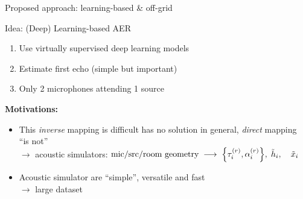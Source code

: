 \begin{frame}{Proposed approach: learning-based \& off-grid \hfill\faProjectDiagram}

    \begin{mydefblock}{Idea: (Deep) Learning-based AER}
        \begin{enumerate}
            \item Use \alert{virtually} supervised deep learning models
            \item Estimate first echo (simple but important) 
            \item Only 2 microphones attending 1 source
        \end{enumerate}
    \end{mydefblock}

    \vfill
    \textbf{Motivations:}
    \begin{itemize}
        \item This \textit{inverse} mapping is difficult has no solution in general, \textit{direct} mapping ``is not''
        \\$\rightarrow$ acoustic simulators:
            $\text{mic/src/room geometry}
            \; \longrightarrow \;
            \set{\tauir,\ampir}, \; \contRIR_i, \quad \contMic_i$
        \item Acoustic simulator are ``simple'', versatile and fast
        \\$\to$ large dataset
    \end{itemize}

\end{frame}

